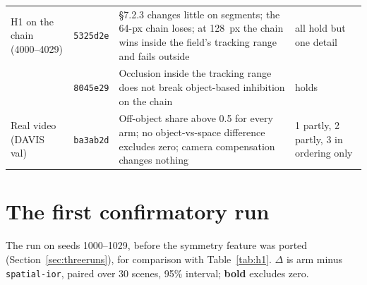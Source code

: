 \documentclass[11pt,a4paper]{article}
\newcommand{\arm}[1]{\texttt{#1}}
\newcommand{\sig}[1]{\textbf{#1}} %
\begin{document}
\begin{center}
\begin{tabularx}{\linewidth}{@{}p{22mm}lXp{22mm}@{}}
\addlinespace
H1 on the chain (4000--4029) & \texttt{5325d2e} & \S7.2.3 changes little on segments; the 64-px chain loses; at 128~px the chain wins inside the field's tracking range and fails outside & all hold but one detail \\
 & \texttt{8045e29} & Occlusion inside the tracking range does not break object-based inhibition on the chain & holds \\
\addlinespace
Real video (DAVIS val) & \texttt{ba3ab2d} & Off-object share above 0.5 for every arm; no object-vs-space difference excludes zero; camera compensation changes nothing & 1 partly, 2 partly, 3 in ordering only \\
\bottomrule
\end{tabularx}
\end{center}

\section{The first confirmatory run}
\label{app:firstrun}
The run on seeds 1000--1029, before the symmetry feature was ported
(Section~\ref{sec:threeruns}), for comparison with Table~\ref{tab:h1}. $\Delta$
is arm minus \arm{spatial-ior}, paired over 30 scenes, 95\% interval;
\sig{bold} excludes zero.
\end{document}
